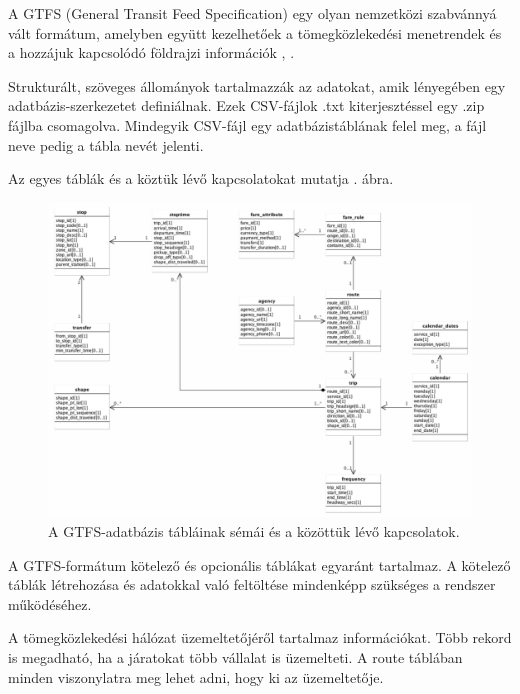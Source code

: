 
A GTFS (General Transit Feed Specification) egy olyan nemzetközi szabvánnyá vált formátum, amelyben együtt kezelhetőek a tömegközlekedési menetrendek és a hozzájuk kapcsolódó földrajzi információk \cite{gtfs}, \cite{gtfsspec}.

Strukturált, szöveges állományok tartalmazzák az adatokat, amik lényegében egy adatbázis-szerkezetet definiálnak. Ezek CSV-fájlok .txt kiterjesztéssel egy .zip fájlba csomagolva. Mindegyik CSV-fájl egy adatbázistáblának felel meg, a fájl neve pedig a tábla nevét jelenti.

Az egyes táblák és a köztük lévő kapcsolatokat mutatja . ábra.

\begin{figure}[htb]
\centering
\includegraphics[scale=0.3]{kepek/gtfs_relationships.png}
\caption{A GTFS-adatbázis tábláinak sémái és a közöttük lévő kapcsolatok.}
\label{fig:gtfs}
\end{figure}

A GTFS-formátum kötelező és opcionális táblákat egyaránt tartalmaz. A kötelező táblák létrehozása és adatokkal való feltöltése mindenképp szükséges a rendszer működéséhez.



A tömegközlekedési hálózat üzemeltetőjéről tartalmaz információkat. Több rekord is megadható, ha a járatokat több vállalat is üzemelteti. A route táblában minden viszonylatra meg lehet adni, hogy ki az üzemeltetője.

